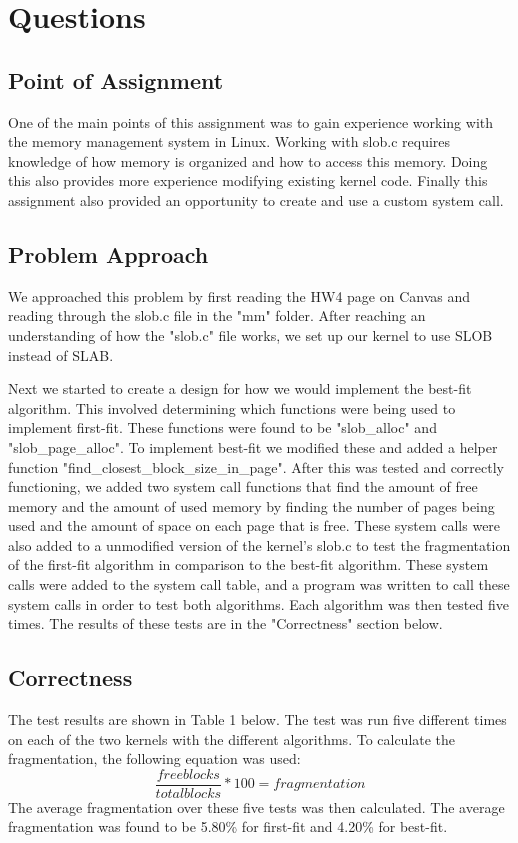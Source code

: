 \section{Questions}
\subsection{Point of Assignment}
One of the main points of this assignment was to gain experience working with the memory management system in Linux. Working with slob.c requires knowledge of how memory is organized and how to access this memory. Doing this also provides more experience modifying existing kernel code. Finally this assignment also provided an opportunity to create and use a custom system call.

\subsection{Problem Approach}
We approached this problem by first reading the HW4 page on Canvas and reading through the slob.c file in the "mm" folder. After reaching an understanding of how the "slob.c" file works, we set up our kernel to use SLOB instead of SLAB. 

Next we started to create a design for how we would implement the best-fit algorithm. This involved determining which functions were being used to implement first-fit. These functions were found to be "slob\_alloc" and "slob\_page\_alloc". To implement best-fit we modified these and added a helper function "find\_closest\_block\_size\_in\_page". After this was tested and correctly functioning, we added two system call functions that find the amount of free memory and the amount of used memory by finding the number of pages being used and the amount of space on each page that is free. These system calls were also added to a unmodified version of the kernel's slob.c to test the fragmentation of the first-fit algorithm in comparison to the best-fit algorithm. These system calls were added to the system call table, and a program was written to call these system calls in order to test both algorithms. Each algorithm was then tested five times. The results of these tests are in the "Correctness" section below.

\subsection{Correctness}
The test results are shown in Table 1 below. The test was run five different times on each of the two kernels with the different algorithms. To calculate the fragmentation, the following equation was used:
\[ \frac{free  blocks}{total blocks}*100 = fragmentation \]
The average fragmentation over these five tests was then calculated. The average fragmentation was found to be 5.80\% for first-fit and 4.20\% for best-fit. 


